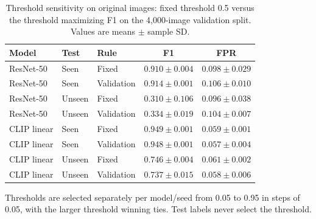 \begin{table}[!htbp]\centering\resulttable
\caption{Threshold sensitivity on original images: fixed threshold 0.5 versus the threshold maximizing F1 on the 4,000-image validation split. Values are means $\pm$ sample SD.}\label{tab:sensitivity}
\begin{tabularx}{\linewidth}{@{}lllCC@{}}\toprule
Model & Test & Rule & F1 & FPR\\\midrule
ResNet-50 & Seen & Fixed & $0.910\pm 0.004$ & $0.098\pm 0.029$\\
ResNet-50 & Seen & Validation & $0.914\pm 0.001$ & $0.106\pm 0.010$\\
ResNet-50 & Unseen & Fixed & $0.310\pm 0.106$ & $0.096\pm 0.038$\\
ResNet-50 & Unseen & Validation & $0.334\pm 0.019$ & $0.104\pm 0.007$\\
CLIP linear & Seen & Fixed & $0.949\pm 0.001$ & $0.059\pm 0.001$\\
CLIP linear & Seen & Validation & $0.948\pm 0.001$ & $0.057\pm 0.004$\\
CLIP linear & Unseen & Fixed & $0.746\pm 0.004$ & $0.061\pm 0.002$\\
CLIP linear & Unseen & Validation & $0.737\pm 0.015$ & $0.058\pm 0.006$\\
\bottomrule\end{tabularx}
\par\smallskip\parbox{\linewidth}{\footnotesize Thresholds are selected separately per model/seed from 0.05 to 0.95 in steps of 0.05, with the larger threshold winning ties. Test labels never select the threshold.}
\end{table}
